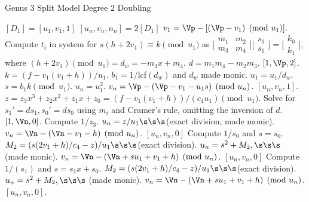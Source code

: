 \begin{algorithm}[htbp]
\caption{Genus 3 Split Model Degree 2 Doubling\label{alg:g3explSPLIT2DBL}}
\begin{algorithmic} [1]
\Require $[D_1]= [u_1, v_1,1]$ \smallskip
\Ensure $[u_n,v_n,n_n] = 2[D_1]$
\algrule
\State $v_1 = \Vp - [(\Vp - v_1) \pmod{u_1}].$
\State Compute $t_i$ in system for $s(h + 2v_1)\equiv k \pmod{u_1}$ as $ \bigl[
\begin{smallmatrix} m_1 & m_2\\ m_3 & m_4\end{smallmatrix}\bigr] \bigl[
\begin{smallmatrix} s_0\\ s_1 \end{smallmatrix} \bigr ] = \bigl[ \begin{smallmatrix}k_0
\\  k_1\end{smallmatrix} \bigr ]$, where $(h + 2v_1) \pmod{u_1} = d_w = -m_3x + m_4.$
\State $d = m_1m_4 - m_2m_3$.
     \hspace{1pt} \Return $[1,\Vp,2]$.
    \Else
        \State $k = (f - v_1(v_1 + h))/u_1$.
        \State $b_1 = 1/$lcf$(d_w)$ and $d_w$ made monic.
        \State $u_1 = u_1/d_w$.
        \State $s = b_1k \pmod{u_1}$.
        \State $u_n = u_1^2$.
        \State $v_n = \Vp - (\Vp - v_1 - u_1s) \pmod{u_n}$.
        \State \Return $[u_n,v_n,1]$.
    \EndIf
\EndIf
\State $z = z_3x^3 + z_2x^2 + z_1x + z_0 = (f - v_1(v_1 + h))/(c_4u_1) \pmod{u_1}.$
\State Solve for $s_1' = ds_1, s_0' = ds_0$ using $m_i$ and Cramer's rule, omitting the inversion of $d$.
         \Return $[1,\Vn,0]$.
        \Else
            \State Compute $1/z_3$.
            \State $u_n = z/u_1 \s\s\s $(exact division, made monic).
            \State $v_n = \Vn - (\Vn - v_1 - h) \pmod{u_n}$.
            \State \Return $[u_n,v_n,0]$
        \EndIf
    \Else \hspace{4pt}
        \State Compute $1/s_0$ and $s= s_0$.
        \State $M_2 = (s(2v_1 + h)/c_4 - z)/u_1 \s\s\s $(exact division).
        \State $u_n = s^2 + M_2, \s\s\s $ (made monic).
        \State $v_n = \Vn - (\Vn + su_1 + v_1 + h) \pmod{u_n}$.
        \State \Return $[u_n,v_n,0]$
    \EndIf
\EndIf
\State Compute $1/(s_1)$ and $s = s_1x + s_0$.
\State $M_2 = (s(2v_1 + h)/c_4 - z)/u_1 \s\s\s $(exact division).
\State $u_n = s^2 + M_2, \s\s\s $ (made monic).
\State $v_n = \Vn - (\Vn + su_1 + v_1 + h) \pmod{u_n}$.
\State \Return $[u_n,v_n,0]$.
\end{algorithmic}
\end{algorithm}
